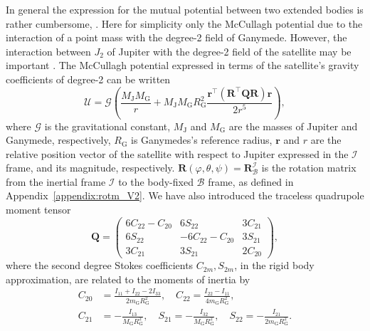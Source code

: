 \documentclass[pdflatex,sn-mathphys-num]{sn-jnl}%
\theoremstyle{thmstyleone}%
\theoremstyle{thmstyletwo}%
\theoremstyle{thmstylethree}%
\renewcommand{\vec}[1]{\boldsymbol{#1}}
\begin{document}
In general the expression for the mutual potential between two extended bodies is rather cumbersome, \citep[see, e.g.,][]{1978CeMec..18..295B, Tricarico2008CeMDA.100..319T}. Here for simplicity  only the McCullagh potential due to the interaction of  a point mass with the degree-2 field of Ganymede. 
However, the interaction between $J_2$ of Jupiter with the degree-2 field of the satellite may be important \citep[see, e.g.,][]{1981M&P....25....3E}. 
The McCullagh potential expressed in terms of the satellite's gravity coefficients of degree-2 can be written 
%
\begin{equation}\label{potential_1b_approx_stokes_V2}
	\mathcal{U} = 	\mathcal{G}
	\left(
	\frac{M_{\mathrm{J}} M_{\mathrm{G}}}{r} 
	+ M_{\mathrm{J}} M_{\mathrm{G}} R_\mathrm{G}^2 \frac{
		 \vec{r}^\top \left( 
	\vec{R}^\top \vec{Q} \vec{R}
		\right) \vec{r}}{2 r^5}
	 \right),
\end{equation}
%
where $\mathcal{G}$ is the gravitational constant,  $M_{\mathrm{J}}$ and $M_{\mathrm{G}}$ are the masses of Jupiter and Ganymede, respectively, $R_{\mathrm{G}}$ is Ganymedes's reference radius, 
$\vec{r}$ and $r$ are the relative position vector of the satellite with respect to Jupiter expressed in the $\mathcal{I}$ frame, and its magnitude, respectively.   
${\vec{R}(\varphi,\theta,\psi) = \vec{R}_{\mathcal{B}}^{\mathcal{I}}}$
is the rotation matrix from the inertial frame $\mathcal{I}$ to the body-fixed $\mathcal{B}$ frame, as defined in Appendix~\ref{appendix:rotm_V2}. 
We have also introduced the traceless quadrupole moment tensor \citep[e.g.,][]{Marchenko2001}
%
\begin{equation}
	\label{eq:def_Q_gravity_coeffs_V2}
	\vec{Q}  = 
	\begin{pmatrix}
		6C_{22} -C_{20} & 6 S_{22}& 3C_{21} \\
	6 S_{22}	& -6C_{22} - C_{20} & 3S_{21}  \\
	3C_{21}	&3S_{21}  & 2C_{20}
	\end{pmatrix}, 
\end{equation}
%
where the second degree Stokes coefficients $C_{2m}, S_{2m}$, in the rigid body approximation, are related to the moments of inertia by
%
\begin{align}
	\label{eq:inertia2stokes_C20_C22_V2}
	C_{20}  &= \frac{I_{11} + I_{22} - 2 I_{33} }{2{m}_\mathrm{G}R_\mathrm{G}^2}, \quad
	C_{22}  = \frac{I_{22} - I_{11}  }{4{m}_\mathrm{G}R_\mathrm{G}^2}, \\
	\label{eq:inertia2stokes_C21_S21_S22_V2}
	C_{21}  &=-  \frac{ I_{13} }{M_{\mathrm{G}}R_\mathrm{G}^2}, \quad
	S_{21}  =-  \frac{ I_{32} }{M_{\mathrm{G}}R_\mathrm{G}^2}, \quad
	S_{22}  =-  \frac{ I_{21} }{2{m}_\mathrm{G}R_\mathrm{G}^2}. 
\end{align}
\end{document}

